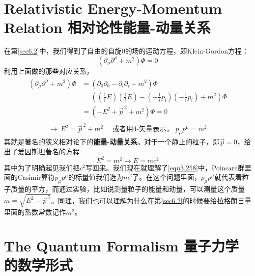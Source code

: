 \section[相对论性能量-动量关系]{Relativistic Energy-Momentum Relation 相对论性能量-动量关系}\label{sec8.2}
在第\ref{sec6.2}中，我们得到了自由的自旋$0$的场的运动方程，即Klein-Gordon方程：
\[(\partial_\mu\partial^\mu+m^2)\Phi=0 \]
利用上面做的那些对应关系，
\begin{align}\begin{split}
(\partial_\mu\partial^\mu+m^2)\Phi&=(\partial_0\partial_0-\partial_i\partial_i+m^2)\Phi\\
&=\left(\left(\frac{1}{i}E\right)\left(\frac{1}{i}E\right)-\left(-\frac{1}{i}p_i\right)\left(-\frac{1}{i}p_i\right)+m^2\right)\Phi\\
&=(-E^2+\vec{p}^{\,2}+m^2)\Phi=0
\end{split}\end{align}
\begin{align}\label{eq8.2}
\to\ E^2=\vec{p}^{\,2}+m^2\quad\text{ 或者用4-矢量表示， }p_\mu p^\mu=m^2
\end{align}
其就是著名的狭义相对论下的{\bf 能量-动量关系}。对于一个静止的粒子，即$\vec{p}=0$，给出了爱因斯坦著名的方程
\[E^2=m^2\to E=mc^2 \]
其中为了明确起见我们把$c^2$写回来。我们现在就理解了\eqref{equ3.258}中，Poincare群里面的Casimir算符$p_\mu p^\mu$的标量值我们选为$m^2$了。在这个问题里面，$p_\mu p^\mu$就代表着粒子质量的平方，而通过实验，比如说测量粒子的能量和动量，可以测量这个质量$m=\sqrt{E^2-\vec{p}^{\,2}}$。同理，我们也可以理解为什么在第\ref{sec6.2}的时候要给拉格朗日量里面的系数常数记作$m^2$。

\section[量子力学的数学形式]{The Quantum Formalism 量子力学的数学形式}

